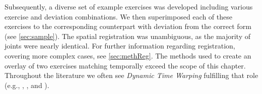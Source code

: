 Subsequently, a diverse set of example exercises was developed including various exercise and deviation combinations. We then superimposed each of these exercises to the corresponding counterpart with deviation from the correct form (see \autoref{sec:sample}). The spatial registration was unambiguous, as the majority of joints were nearly identical. For further information regarding registration, covering more complex cases, see \autoref{sec:methReg}. The methods used to create an overlay of two exercises matching temporally exceed the scope of this chapter. Throughout the literature we often see \emph{Dynamic Time Warping} fulfilling that role (e.g., \cite{su2013pre}, \cite{anton2015pre}, and \cite{saenz2016kbv}).


\begin{figure}[t!]
	\centering

\end{figure}
